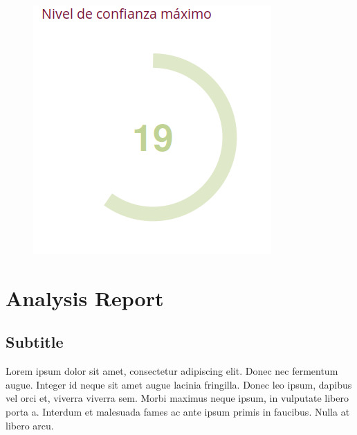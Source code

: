 \documentclass[10,a4paperpaper,]{article}
\begin{document}
\begin{figure}[!htb]
\begin{minipage}{0.3\textwidth}
  \end{minipage}
  \begin{minipage}{0.3\textwidth}
    \centering
    \includegraphics[width=1.1\linewidth]{figures/nivelConfiMax.png}
    \end{minipage}
\end{figure}

\newpage

\section{Analysis Report}

\subsection{Subtitle}

Lorem ipsum dolor sit amet, consectetur adipiscing elit. Donec nec
fermentum augue. Integer id neque sit amet augue lacinia fringilla.
Donec leo ipsum, dapibus vel orci et, viverra viverra sem. Morbi maximus
neque ipsum, in vulputate libero porta a. Interdum et malesuada fames ac
ante ipsum primis in faucibus. Nulla at libero arcu.
\end{document}

